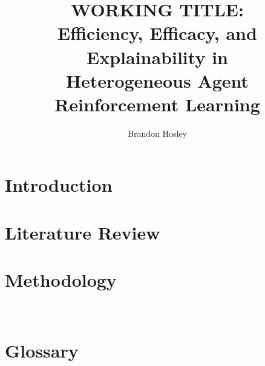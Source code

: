 \documentclass{afitthesis}
\title{ WORKING TITLE:\\
    Efficiency, Efficacy, and Explainability in\\
    Heterogeneous Agent Reinforcement Learning }
\author{Brandon Hosley}
\begin{document}
\maketitle %


\chapter{Introduction}


\chapter{Literature Review}%
\label{ch:literature_review}


\chapter{Methodology}%
\label{ch:methodology}



\label{ch:results}%


~\label{ch:discussion}

\label{ch:conclusion}%


%
%


\appendix %

\chapter{Glossary}
\printunsrtglossary[type=symbols,title=Summary of Notation]
\printglossaries%


\nocite{*} %
\clearpage{}%
\printbibliography%
\end{document}
